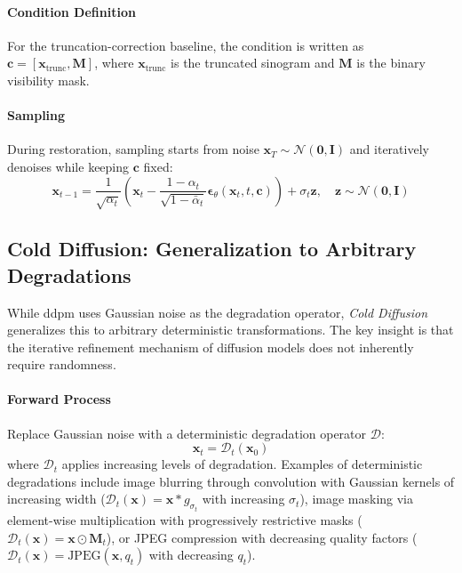 \paragraph{Condition Definition} For the truncation-correction baseline, the condition is written as $\mathbf{c} = [\mathbf{x}_{\text{trunc}}, \mathbf{M}]$, where $\mathbf{x}_{\text{trunc}}$ is the truncated sinogram and $\mathbf{M}$ is the binary visibility mask.

\paragraph{Sampling} During restoration, sampling starts from noise $\mathbf{x}_T \sim \mathcal{N}(\mathbf{0}, \mathbf{I})$ and iteratively denoises while keeping $\mathbf{c}$ fixed:
%
\begin{equation}
\mathbf{x}_{t-1} = \frac{1}{\sqrt{\alpha_t}}\left(\mathbf{x}_t - \frac{1-\alpha_t}{\sqrt{1-\bar{\alpha}_t}}\boldsymbol{\epsilon}_\theta(\mathbf{x}_t, t, \mathbf{c})\right) + \sigma_t \mathbf{z}, \quad \mathbf{z} \sim \mathcal{N}(\mathbf{0}, \mathbf{I})
\end{equation}

\subsection{Cold Diffusion: Generalization to Arbitrary Degradations}

While \gls{ddpm} uses Gaussian noise as the degradation operator, \textit{Cold Diffusion}~\cite{bansal2022cold} generalizes this to arbitrary deterministic transformations. The key insight is that the iterative refinement mechanism of diffusion models does not inherently require randomness.

\paragraph{Forward Process} Replace Gaussian noise with a deterministic degradation operator $\mathcal{D}$:
%
\begin{equation}
\mathbf{x}_t = \mathcal{D}_t(\mathbf{x}_0)
\end{equation}
%
where $\mathcal{D}_t$ applies increasing levels of degradation. Examples of deterministic degradations include image blurring through convolution with Gaussian kernels of increasing width ($\mathcal{D}_t(\mathbf{x}) = \mathbf{x} \ast g_{\sigma_t}$ with increasing $\sigma_t$), image masking via element-wise multiplication with progressively restrictive masks ($\mathcal{D}_t(\mathbf{x}) = \mathbf{x} \odot \mathbf{M}_t$), or JPEG compression with decreasing quality factors ($\mathcal{D}_t(\mathbf{x}) = \text{JPEG}(\mathbf{x}, q_t)$ with decreasing $q_t$).

